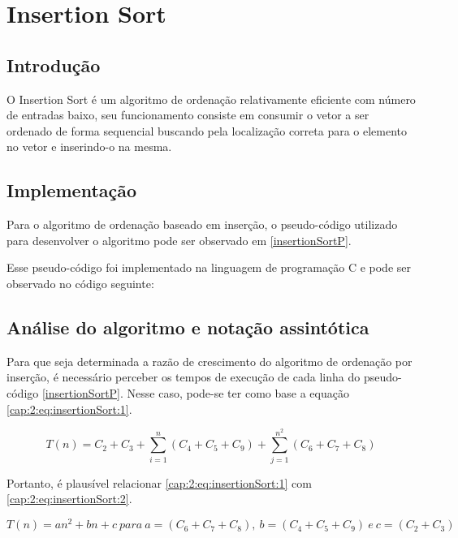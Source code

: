 \section{Insertion Sort} \label{cap:2:section:isort}

\subsection{Introdução}

O Insertion Sort é um algoritmo de ordenação relativamente eficiente com número de entradas baixo,
seu funcionamento consiste em consumir o vetor a ser ordenado de forma sequencial buscando pela
localização correta para o elemento no vetor e inserindo-o na mesma.

\subsection{Implementação}

Para o algoritmo de ordenação baseado em inserção, o pseudo-código utilizado para desenvolver o
algoritmo pode ser observado em \ref{insertionSortP}.



Esse pseudo-código foi implementado na linguagem de programação C 
e pode ser observado no código seguinte:



\subsection{Análise do algoritmo e notação assintótica}

Para que seja determinada a razão de crescimento do algoritmo de ordenação por inserção, é necessário
perceber os tempos de execução de cada linha do pseudo-código \ref{insertionSortP}.
Nesse caso, pode-se ter como base a equação \ref{cap:2:eq:insertionSort:1}.

\begin{equation} \label{cap:2:eq:insertionSort:1}
    T(n) = C_2 + C_3 + \sum_{i=1}^{n}(C_4 + C_5 + C_9) + \sum_{j=1}^{n^2}(C_6 + C_7 + C_8) 
\end{equation}

Portanto, é plausível relacionar \ref{cap:2:eq:insertionSort:1} com \ref{cap:2:eq:insertionSort:2}.

\begin{equation} \label{cap:2:eq:insertionSort:2}
    T(n) = an^2 + bn + c \  para\  a = (C_6 + C_7 + C_8),\  b = (C_4 + C_5 + C_9)\  e\  c = (C_2 + C_3)
\end{equation}

